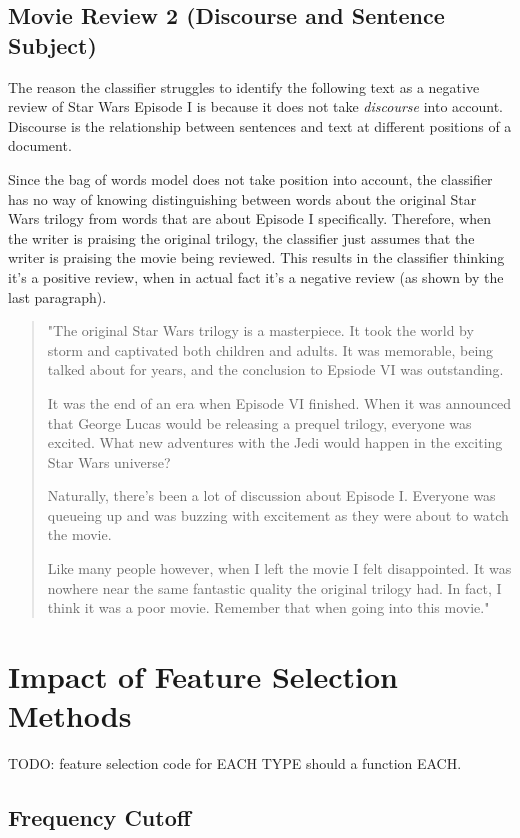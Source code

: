 \documentclass{article}
\begin{document}
\subsection{Movie Review 2 (Discourse and Sentence Subject)}

The reason the classifier struggles to identify the following text as a negative review of Star Wars Episode I is because it does not take \textit{discourse} into account. Discourse is the relationship between sentences and text at different positions of a document.

Since the bag of words model does not take position into account, the classifier has no way of knowing distinguishing between words about the original Star Wars trilogy from words that are about Episode I specifically. Therefore, when the writer is praising the original trilogy, the classifier just assumes that the writer is praising the movie being reviewed. This results in the classifier thinking it's a positive review, when in actual fact it's a negative review (as shown by the last paragraph).

\begin{quote}
"The original Star Wars trilogy is a masterpiece. It took the world by storm and captivated both children and adults. It was memorable, being talked about for years, and the conclusion to Epsiode VI was outstanding.

It was the end of an era when Episode VI finished. When it was announced that George Lucas would be releasing a prequel trilogy, everyone was excited. What new adventures with the Jedi would happen in the exciting Star Wars universe?

Naturally, there's been a lot of discussion about Episode I. Everyone was queueing up and was buzzing with excitement as they were about to watch the movie.

Like many people however, when I left the movie I felt disappointed. It was nowhere near the same fantastic quality the original trilogy had. In fact, I think it was a poor movie. Remember that when going into this movie."
\end{quote}

\section{Impact of Feature Selection Methods}

TODO: feature selection code for EACH TYPE should a function EACH. 

\subsection{Frequency Cutoff}
\end{document}
